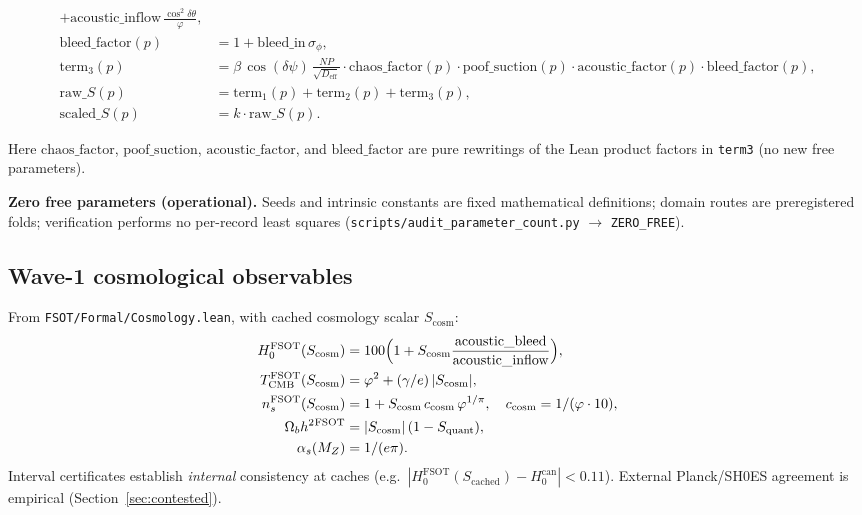 \documentclass[11pt,a4paper]{article}
\begin{document}
\begin{align}
     +\mathrm{acoustic\_inflow}\,\frac{\cos^2\delta\theta}{\varphi},
\label{eq:acoustf}\\
\mathrm{bleed\_factor}(p)
  &= 1+\mathrm{bleed\_in}\,\sigma_\phi,
\label{eq:bleedf}\\
\mathrm{term}_3(p)
  &= \beta\,\cos(\delta\psi)\,\frac{NP}{\sqrt{D_{\mathrm{eff}}}}
     \cdot\mathrm{chaos\_factor}(p)
     \cdot\mathrm{poof\_suction}(p)
     \cdot\mathrm{acoustic\_factor}(p)
     \cdot\mathrm{bleed\_factor}(p),
\label{eq:t3}\\
\mathrm{raw}\_S(p)
  &= \mathrm{term}_1(p)+\mathrm{term}_2(p)+\mathrm{term}_3(p),
\label{eq:rawS}\\
\mathrm{scaled}\_S(p)
  &= k\cdot\mathrm{raw}\_S(p).
\label{eq:scaledS}
\end{align}

\noindent
Here $\mathrm{chaos\_factor}$, $\mathrm{poof\_suction}$,
$\mathrm{acoustic\_factor}$, and $\mathrm{bleed\_factor}$ are pure
rewritings of the Lean product factors in \texttt{term3} (no new free
parameters).

\textbf{Zero free parameters (operational).}
Seeds and intrinsic constants are fixed mathematical definitions; domain routes
are preregistered folds; verification performs no per-record least squares
(\texttt{scripts/audit\_parameter\_count.py} $\to$ \texttt{ZERO\_FREE}).

\subsection{Wave-1 cosmological observables}

From \texttt{FSOT/Formal/Cosmology.lean}, with cached cosmology scalar
$S_{\mathrm{cosm}}$:
\begin{align}
H_0^{\mathrm{FSOT}}(S_{\mathrm{cosm}})
  &= 100\Bigl(1+S_{\mathrm{cosm}}
     \frac{\mathrm{acoustic\_bleed}}{\mathrm{acoustic\_inflow}}\Bigr),
\label{eq:h0}\\
T_{\mathrm{CMB}}^{\mathrm{FSOT}}(S_{\mathrm{cosm}})
  &= \varphi^2+(\gamma/e)\,|S_{\mathrm{cosm}}|,
\label{eq:tcmb}\\
n_s^{\mathrm{FSOT}}(S_{\mathrm{cosm}})
  &= 1+S_{\mathrm{cosm}}\,c_{\mathrm{cosm}}\,\varphi^{1/\pi},
  \quad c_{\mathrm{cosm}}=1/(\varphi\cdot 10),
\label{eq:ns}\\
\Omega_b h^{2}{}^{\mathrm{FSOT}}
  &= |S_{\mathrm{cosm}}|\,(1-S_{\mathrm{quant}}),
\label{eq:omb}\\
\alpha_s(M_Z) &= 1/(e\pi).
\label{eq:alphas}
\end{align}
Interval certificates establish \emph{internal} consistency at caches
(e.g.\ $|H_0^{\mathrm{FSOT}}(S_{\mathrm{cached}})-H_0^{\mathrm{can}}|<0.11$).
External Planck/SH0ES agreement is empirical (Section~\ref{sec:contested}).
\end{document}
